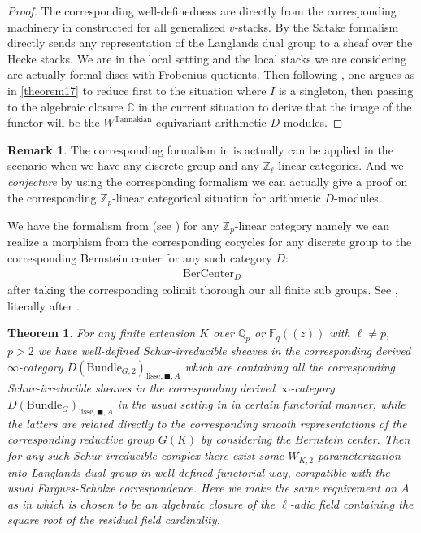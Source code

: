 \documentclass[12pt]{book}
\newtheorem{theorem}{Theorem}
\theoremstyle{definition}
\newtheorem{remark}{Remark}
\begin{document}
\begin{proof}
The corresponding well-definedness are directly from the corresponding machinery in \cite{AI} constructed for all generalized $v$-stacks. By \cite[Section 3]{XZ} the Satake formalism directly sends any representation of the Langlands dual group to a sheaf over the Hecke stacks. We are in the local setting and the local stacks we are considering are actually formal discs with Frobenius quotients. Then following \cite{VLa}, \cite{FS} one argues as in \cref{theorem17} to reduce first to the situation where $I$ is a singleton, then passing to the algebraic closure $\mathbb{C}$ in the current situation to derive that the image of the functor will be the $W^\mathrm{Tannakian}$-equivariant arithmetic $D$-modules.
 \end{proof}

\begin{remark}
The corresponding formalism in \cite[Chapter VIII Theorem 4.1, Chapter IX Proposition 4.1, and the proof]{FS} is actually can be applied in the scenario when we have any discrete group and any $\mathbb{Z}_\ell$-linear categories. And we \textit{conjecture} by using the corresponding formalism we can actually give a proof on the corresponding $\mathbb{Z}_p$-linear categorical situation for arithmetic $D$-modules.
\end{remark}



We have the formalism from \cite{VLa} (see \cite[Chapter VIII Theorem 4.1 and Chapter IX Proposition 4.1]{FS}) for any $\mathbb{Z}_p$-linear category namely we can realize a morphism from the corresponding cocycles for any discrete group to the corresponding Bernstein center for any such category $D$:
\begin{align}
\mathrm{BerCenter}_D
\end{align}
after taking the corresponding colimit thorough our all finite sub groups. See \cite[Chapter VIII Theorem 4.1 and Chapter IX Proposition 4.1]{FS}, literally after \cite{VLa}. 



\begin{theorem}
For any finite extension $K$ over $\mathbb{Q}_p$ or $\mathbb{F}_q((z))$ with $\ell\neq p$, $p>2$ we have well-defined Schur-irreducible sheaves in the corresponding derived $\infty$-category $D(\mathrm{Bundle}_{G,2})_{\text{lisse},\blacksquare,A}$ which are containing all the corresponding Schur-irreducible sheaves in the corresponding derived $\infty$-category $D(\mathrm{Bundle}_{G})_{\text{lisse},\blacksquare,A}$ in the usual setting in \cite{FS} in certain functorial manner, while the latters are related directly to the corresponding smooth representations of the corresponding reductive group $G(K)$ by considering the Bernstein center. Then for any such Schur-irreducible complex there exist some $W_{K,2}$-parameterization into Langlands dual group in well-defined functorial way, compatible with the usual Fargues-Scholze correspondence. Here we make the same requirement on $A$ as in \cite{FS} which is chosen to be an algebraic closure of the $\ell$-adic field containing the square root of the residual field cardinality.
\end{theorem}
\end{document}
